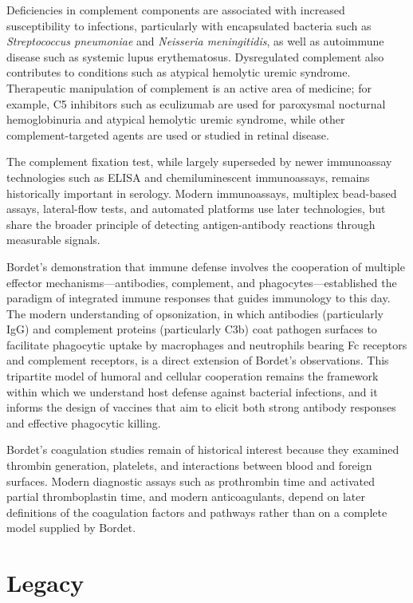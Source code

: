 Deficiencies in complement components are associated with increased susceptibility to infections, particularly with encapsulated bacteria such as \emph{Streptococcus pneumoniae} and \emph{Neisseria meningitidis}, as well as autoimmune disease such as systemic lupus erythematosus. Dysregulated complement also contributes to conditions such as atypical hemolytic uremic syndrome. Therapeutic manipulation of complement is an active area of medicine; for example, C5 inhibitors such as eculizumab are used for paroxysmal nocturnal hemoglobinuria and atypical hemolytic uremic syndrome, while other complement-targeted agents are used or studied in retinal disease.\cite{bordet-modern}

The complement fixation test, while largely superseded by newer immunoassay technologies such as ELISA and chemiluminescent immunoassays, remains historically important in serology. Modern immunoassays, multiplex bead-based assays, lateral-flow tests, and automated platforms use later technologies, but share the broader principle of detecting antigen-antibody reactions through measurable signals.\cite{bordet-history}

Bordet's demonstration that immune defense involves the cooperation of multiple effector mechanisms---antibodies, complement, and phagocytes---established the paradigm of integrated immune responses that guides immunology to this day. The modern understanding of opsonization, in which antibodies (particularly IgG) and complement proteins (particularly C3b) coat pathogen surfaces to facilitate phagocytic uptake by macrophages and neutrophils bearing Fc receptors and complement receptors, is a direct extension of Bordet's observations. This tripartite model of humoral and cellular cooperation remains the framework within which we understand host defense against bacterial infections, and it informs the design of vaccines that aim to elicit both strong antibody responses and effective phagocytic killing.

Bordet's coagulation studies remain of historical interest because they examined thrombin generation, platelets, and interactions between blood and foreign surfaces. Modern diagnostic assays such as prothrombin time and activated partial thromboplastin time, and modern anticoagulants, depend on later definitions of the coagulation factors and pathways rather than on a complete model supplied by Bordet.

\section{Legacy}

